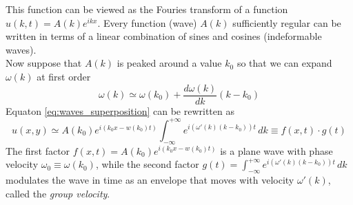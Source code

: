 This function can be viewed as the Fouries transform of a function $u(k,t) = A(k)e^{ikx}$.
Every function (wave) $A(k)$ sufficiently regular can be written in terms of a linear combination of sines and cosines (indeformable waves). \\
Now suppose that $A(k)$ is peaked around a value $k_0$ so that we can expand $\omega(k)$ at first order 
$$\omega(k) \simeq \omega(k_0) + \frac{d\omega(k)}{dk}(k-k_0)$$ Equaton \ref{eq:waves_superposition} can be rewritten as 
\begin{equation*}
    u(x,y) \simeq A(k_0)e^{i(k_0x - w(k_0) t)} \int_{-\infty}^{+\infty} e^{i(\omega'(k)(k-k_0))t} \, dk 
    \equiv f(x,t) \cdot g(t)
\end{equation*}
The first factor $f(x,t) = A(k_0)e^{i(k_0x - w(k_0) t)}$ is a plane wave with phase velocity $\omega_0 \equiv \omega(k_0)$, while the second factor
$g(t) = \int_{-\infty}^{+\infty} e^{i(\omega'(k)(k-k_0))t} \, dk$ modulates the wave in time as an envelope that moves with velocity $\omega'(k)$, called the \emph{group velocity}.